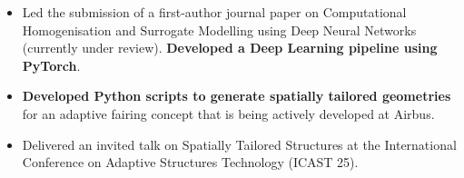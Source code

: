 \documentclass[10pt,a4paper,ragged2e, normalphoto]{altacv}
\begin{document}
\personalinfo{%
  \location{Bristol, UK}
  \email{nuhaadhmahid@gmail.com}
  \linkedin{\url{https://linkedin.com/in/nuhaadhmahid}}
}

\begin{fullwidth}
\makecvheader
\end{fullwidth}



\begin{itemize}
    \item Led the submission of a first-author journal paper on Computational Homogenisation and Surrogate Modelling using Deep Neural Networks (currently under review). \textbf{Developed a Deep Learning pipeline using PyTorch}.
    \item \textbf{Developed Python scripts to generate spatially tailored geometries} for an adaptive fairing concept that is being actively developed at Airbus.
    \item Delivered an invited talk on Spatially Tailored Structures at the International Conference on Adaptive Structures Technology (ICAST 25).
\end{itemize}
\vspace{-0.35em}
\divider
\end{document}
